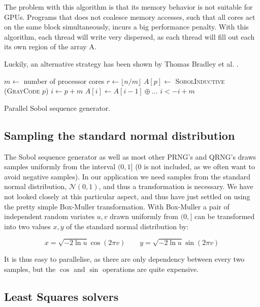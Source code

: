 The problem with this algorithm is that its memory behavior is not
suitable for GPUs. Programs that does not coalesce memory accesses,
such that all cores act on the same block simultaneously, incurs a big
performance penalty. With this algorithm, each thread will write very
dispersed, as each thread will fill out each its own region of the
array A.

Luckily, an alternative strategy has been shown by Thomas Bradley et
al. \cite{bradley2010parallelisation} .

\begin{algorithm}
  \todo{remember to normalise to $(0,1]$}
  \begin{algorithmic}
    \State $m \gets$ number of processor cores
    \State $r \gets \lfloor n/m \rfloor$
    \State $A[p] \gets$ \textsc{SobolInductive} (\textsc{GrayCode} $p$)
    \State $i \gets p + m$
    \State $A[i] \gets A[i - 1] \oplus \ldots$
    \State $i <- i + m$
    \EndWhile
    \EndParFor
    \EndFunction
  \end{algorithmic}
  \caption{Parallel Sobol sequence generator.}
  \label{alg:sobol-parallel-1}
\end{algorithm}


\subsection{Sampling the standard normal distribution}
The Sobol sequence generator as well as most other PRNG's and QRNG's
draws samples uniformly from the interval $(0,1]$ ($0$ is not
included, as we often want to avoid negative samples). In our
application we need samples from the standard normal distribution,
$\mathcal{N}(0,1)$, and thus a transformation is necessary. We have
not looked closely at this particular aspect, and thus have just
settled on using the pretty simple Box-Muller transformation. With
Box-Muller a pair of independent random variates $u,v$ drawn uniformly
from $(0,]$ can be transformed into two values $x,y$ of the standard normal
distribution by:

\begin{equation*}
  x =\sqrt{-2 \ln u} \cos(2 \pi v) \quad\quad
  y = \sqrt{-2 \ln u} \sin(2 \pi v)
\end{equation*}

It is thus easy to parallelise, as there are only dependency between
every two samples, but the $\cos$ and $\sin$ operations are quite
expensive. 

\subsection{Least Squares solvers}

